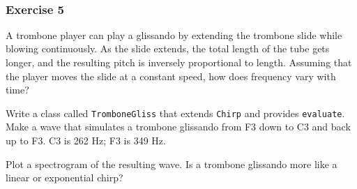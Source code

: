 \documentclass[11pt]{article}
\begin{document}
    \begin{center}
    \end{center}
    { \hspace*{\fill} \\}
    
    \hypertarget{exercise-5}{%
\subsubsection{Exercise 5}\label{exercise-5}}

A trombone player can play a glissando by extending the trombone slide
while blowing continuously. As the slide extends, the total length of
the tube gets longer, and the resulting pitch is inversely proportional
to length. Assuming that the player moves the slide at a constant speed,
how does frequency vary with time?

Write a class called \texttt{TromboneGliss} that extends \texttt{Chirp}
and provides \texttt{evaluate}. Make a wave that simulates a trombone
glissando from F3 down to C3 and back up to F3. C3 is 262 Hz; F3 is 349
Hz.

Plot a spectrogram of the resulting wave. Is a trombone glissando more
like a linear or exponential chirp?
\end{document}
